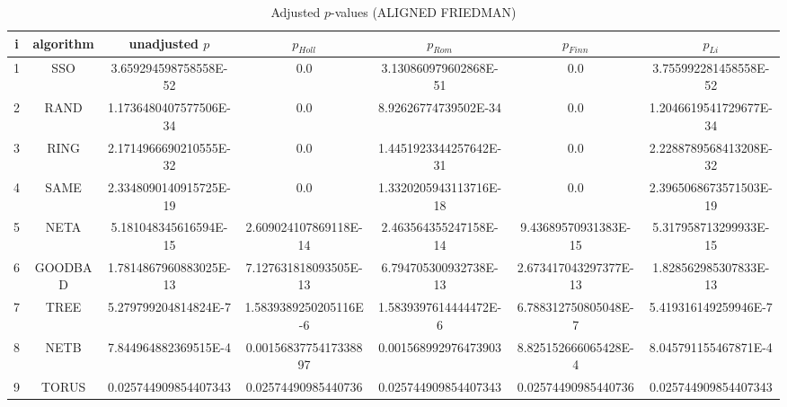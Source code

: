 \documentclass[a4paper,10pt]{article}
\begin{document}
\begin{landscape}
\begin{table}[!htp]
\centering\scriptsize
\caption{Adjusted $p$-values (ALIGNED FRIEDMAN)}
\begin{tabular}{ccccccc}
i&algorithm&unadjusted $p$&$p_{Holl}$&$p_{Rom}$&$p_{Finn}$&$p_{Li}$\\
\hline
1& SSO&3.659294598758558E-52&0.0&3.130860979602868E-51&0.0&3.755992281458558E-52\\
2& RAND&1.1736480407577506E-34&0.0&8.92626774739502E-34&0.0&1.2046619541729677E-34\\
3& RING&2.1714966690210555E-32&0.0&1.4451923344257642E-31&0.0&2.2288789568413208E-32\\
4& SAME&2.3348090140915725E-19&0.0&1.3320205943113716E-18&0.0&2.3965068673571503E-19\\
5& NETA&5.181048345616594E-15&2.609024107869118E-14&2.463564355247158E-14&9.43689570931383E-15&5.317958713299933E-15\\
6& GOODBAD&1.7814867960883025E-13&7.127631818093505E-13&6.794705300932738E-13&2.673417043297377E-13&1.828562985307833E-13\\
7& TREE&5.279799204814824E-7&1.5839389250205116E-6&1.5839397614444472E-6&6.788312750805048E-7&5.419316149259946E-7\\
8& NETB&7.844964882369515E-4&0.0015683775417338897&0.001568992976473903&8.825152666065428E-4&8.045791155467871E-4\\
9& TORUS&0.025744909854407343&0.02574490985440736&0.025744909854407343&0.02574490985440736&0.025744909854407343\\
\hline
\end{tabular}
\end{table}


\newpage


\end{landscape}
\end{document}
